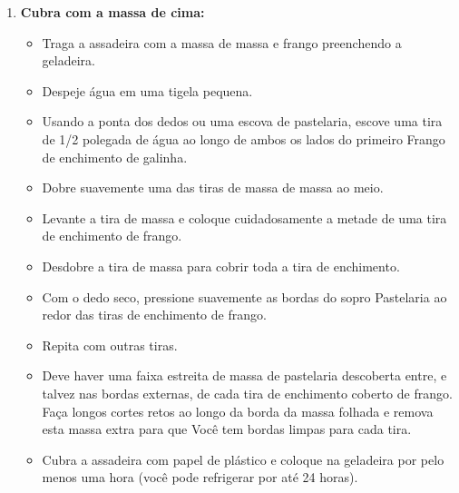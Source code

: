 \documentclass [11pt, letterpaper] {article}
\begin{document}
\begin {description}
\begin{enumerate}
\begin{itemize}
        parafusos revestidos de papel em pergaminho e colocá-lo no
        refrigerador até esfriar e firmar para que você possa
        trabalho contínuo.
        \item Quando a massa folhada estiver esticada, corte as arestas,
        usando uma régua divida a massa no mesmo número de
        tiras que você dividiu o enchimento na assadeira com
        a massa de pastelaria.
        \begin {itemize}
                \item Faça pequenos cortes em ambos os lados da massa para
                marque os cortes.
                \item Use a borda da assadeira como guia para
                corte as tiras.
        \end {itemize}
        \end{itemize}
\item{\bf Cubra com a massa de cima:}    
       \begin{itemize}   
\item Traga a assadeira com a massa de massa e frango
        preenchendo a geladeira.
        \item Despeje água em uma tigela pequena.
        \item Usando a ponta dos dedos ou uma escova de pastelaria,
        escove uma tira de 1/2 polegada de água ao longo de ambos os lados do primeiro
        Frango de enchimento de galinha.
        \item Dobre suavemente uma das tiras de massa de massa ao meio.
        \item Levante a tira de massa e coloque cuidadosamente a metade de
        uma tira de enchimento de frango.
        \item Desdobre a tira de massa para cobrir toda a tira de enchimento.
        \item Com o dedo seco, pressione suavemente as bordas do sopro
        Pastelaria ao redor das tiras de enchimento de frango.
        \item Repita com outras tiras.
        \item Deve haver uma faixa estreita de massa de pastelaria descoberta
        entre, e talvez nas bordas externas, de cada tira de
        enchimento coberto de frango. Faça longos cortes retos ao longo da
        borda da massa folhada e remova esta massa extra para que
        Você tem bordas limpas para cada tira.

        \item Cubra a assadeira com papel de plástico e coloque
        na geladeira por pelo menos uma hora (você pode refrigerar por at\'e
        24 horas).
        \end {itemize}



\end{enumerate}
\end{description}
\end{document}
